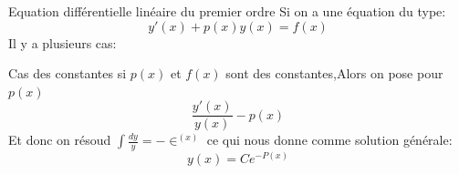 \begin{parag}{Equation différentielle linéaire du premier ordre}
    Si on a une équation du type:
    \begin{equation*} y'\left(x\right) + p\left(x\right)y\left(x\right) = f\left(x\right)  \end{equation*}
    Il y a plusieurs cas:
    \begin{subparag}{Cas des constantes}
        si $p\left(x\right)$ et $f\left(x\right)$ sont des constantes,Alors on pose pour $p\left(x\right)$
        \begin{equation*} \frac{y'\left(x\right)}{y\left(x\right)} -p\left(x\right) \end{equation*}
        Et donc on résoud $\int \frac{dy}{y} = -\in^{\left(x\right)}$ ce qui nous donne comme solution générale:
        \begin{equation*} y\left(x\right) = Ce^{-P\left(x\right)} \end{equation*}
    \end{subparag}
    
\end{parag}
